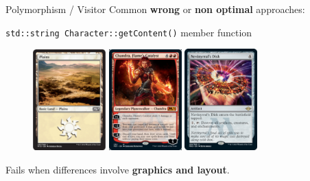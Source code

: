 \documentclass[11pt]{beamer}
\renewcommand{\emph}[1]{\textbf{#1}}
\begin{document}
\begin{frame}[fragile]{Polymorphism / Visitor}
 Common \emph{wrong} or \emph{non optimal} approaches:
 
 \begin{center}
  \texttt{std::string Character::getContent()} member function
 \end{center}
 
 \begin{figure}
  \includegraphics[width=0.25\textwidth]{assets/figure-magic-land}
  \includegraphics[width=0.25\textwidth]{assets/figure-magic-creature}
  \includegraphics[width=0.25\textwidth]{assets/figure-magic-artifact}
 \end{figure}

 Fails when differences involve \emph{graphics and layout}.
\end{frame}
\end{document}
